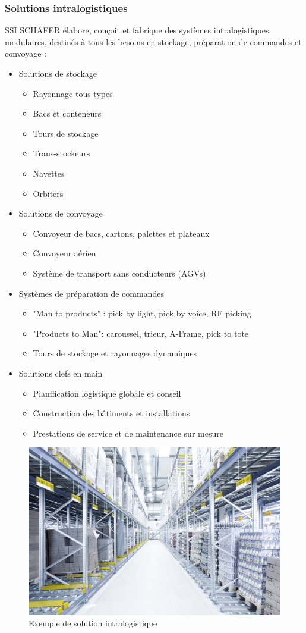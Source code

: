 \documentclass[a4paper, 12pt, french]{article}
\newcommand{\bdot}{\item[\color{ssiYellow}\ding{108}]}
\newcommand{\bdotoutlined}{\item[\color{ssiYellow}\ding{109}]}
\begin{document}
		\subsubsection{Solutions intralogistiques}
	SSI SCHÄFER élabore, conçoit et fabrique des systèmes intralogistiques modulaires, destinés à tous les besoins en stockage, préparation de commandes et convoyage :
				\begin{itemize}
					\bdot{Solutions de stockage}
						\begin{itemize}
							\bdotoutlined{Rayonnage tous types}
							\bdotoutlined{Bacs et conteneurs}
							\bdotoutlined{Tours de stockage}
							\bdotoutlined{Trans-stockeurs}
							\bdotoutlined{Navettes}
							\bdotoutlined{Orbiters}
						\end{itemize}
					\bdot{Solutions de convoyage}
						\begin{itemize}
							\bdotoutlined{Convoyeur de bacs, cartons, palettes et plateaux}
							\bdotoutlined{Convoyeur aérien}
							\bdotoutlined{Système de transport sans conducteurs (AGVs)}
						\end{itemize}
					\bdot{Systèmes de préparation de commandes}
						\begin{itemize}
							\bdotoutlined{"Man to products" : pick by light, pick by voice, RF picking}
							\bdotoutlined{"Products to Man": caroussel, trieur, A-Frame, pick to tote}
							\bdotoutlined{Tours de stockage et rayonnages dynamiques}
						\end{itemize}
					\bdot{Solutions clefs en main}
						\begin{itemize}
							\bdotoutlined{Planification logistique globale et conseil}
							\bdotoutlined{Construction des bâtiments et installations}
							\bdotoutlined{Prestations de service et de maintenance sur mesure}
						\end{itemize}
				\end{itemize}

			\begin{figure}[h!]
				\begin{center}
					\includegraphics[width=0.7\linewidth]{images/intralogistic.jpg}
				\end{center}
				\caption{Exemple de solution intralogistique}
				\label{fig:intralogistic}
			\end{figure}	
	
\end{document}
